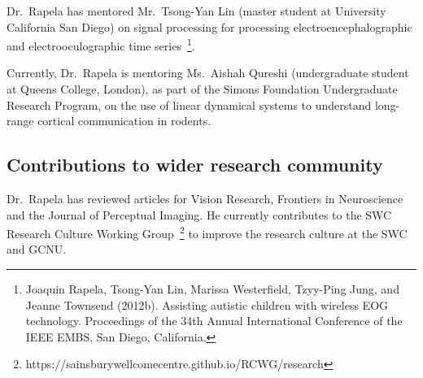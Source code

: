Dr.~Rapela has mentored Mr.~Tsong-Yan Lin (master student at University
California San Diego) on signal processing for processing
electroencephalographic and electrooculographic time
series~\footnote{Joaquin Rapela, Tsong-Yan Lin, Marissa Westerfield, Tzyy-Ping
Jung, and Jeanne Townsend (2012b). Assisting autistic children with wireless
EOG technology. Proceedings of the 34th Annual International Conference of the
IEEE EMBS, San Diego, California.}.

Currently, Dr.~Rapela is mentoring Ms.~Aishah Qureshi (undergraduate student at
Queens College, London), as part of the Simons Foundation Undergraduate Research
Program, on the use of linear dynamical systems to understand long-range
cortical communication in rodents.


% 

\subsection{Contributions to wider research community}

Dr.~Rapela has reviewed articles for Vision Research, Frontiers in Neuroscience
and the Journal of Perceptual Imaging. He currently contributes to the SWC
Research Culture Working
Group~\footnote{https://sainsburywellcomecentre.github.io/RCWG/research} to
improve the research culture at the SWC and GCNU.




% 
